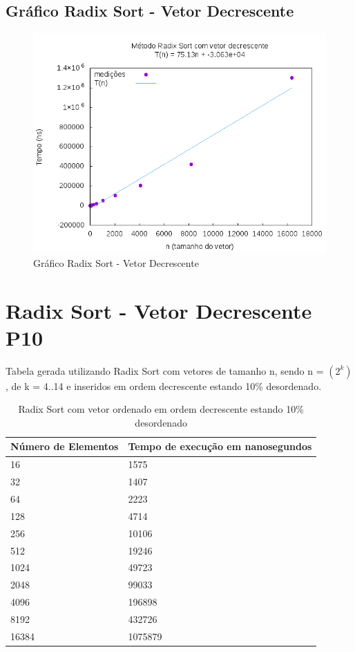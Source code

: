 \documentclass[12pt,a4paper,twoside]{report}
\begin{document}
\subsection{Gráfico Radix Sort - Vetor Decrescente}
\begin{figure}[H]
    \centering
    \includegraphics[width=0.7\linewidth]{graficos/RadixSort/vIntDecrescente/vIntDecrescente.png}
  \caption{Gráfico Radix Sort - Vetor Decrescente}
\end{figure}

\section{Radix Sort - Vetor Decrescente P10}
Tabela gerada utilizando Radix Sort com vetores de tamanho n, sendo n = $(2^k)$, de k = 4..14 e inseridos em ordem decrescente estando 10\% desordenado.
\begin{table}[H]
\centering
\caption{Radix Sort com vetor ordenado em ordem decrescente estando 10\% desordenado}
\label{my-label}
\begin{tabular}{|l|l|}
\hline
\multicolumn{1}{|c|}{\textbf{Número de Elementos}} & \multicolumn{1}{c|}{\textbf{Tempo de execução em nanosegundos}} \\ \hline
16 & 1575 \\ \hline
32 & 1407 \\ \hline
64 & 2223 \\ \hline
128 & 4714 \\ \hline
256 & 10106 \\ \hline
512 & 19246 \\ \hline
1024 & 49723 \\ \hline
2048 & 99033 \\ \hline
4096 & 196898 \\ \hline
8192 & 432726 \\ \hline
16384 & 1075879 \\ \hline
\end{tabular}
\end{table}
\end{document}
